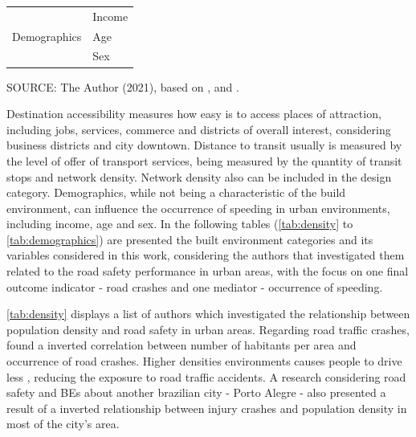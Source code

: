 \begin{table}[!hbtp]
\begin{tabular}{ll}
                                                    \hline
        \multirow{3}{*}{Demographics}              & Income                                   \\
                                                   & Age                                      \\
                                                   & Sex                                      \\ \hline
        \end{tabular}
    \label{tab:6d}
    \par \vspace{2mm} \footnotesize \raggedright
    SOURCE: The Author (2021), based on \textcite{Ewing2009}, \textcite{Ewing2010} and \textcite{Obelheiro2020}.
\end{table}

Destination accessibility measures how easy is to access places of attraction, including jobs, services, commerce and districts of overall interest, considering business districts and city downtown. Distance to transit usually is measured by the level of offer of transport services, being measured by the quantity of transit stops and network density. Network density also can be included in the design category. Demographics, while not being a characteristic of the build environment, can influence the occurrence of speeding in urban environments, including income, age and sex. In the following tables (\autoref{tab:density} to \autoref{tab:demographics}) are presented the built environment categories and its variables considered in this work, considering the authors that investigated them related to the road safety performance in urban areas, with the focus on one final outcome indicator - road crashes and one mediator - occurrence of speeding.



\autoref{tab:density} displays a list of authors which investigated the relationship between population density and road safety in urban areas. Regarding road traffic crashes, \textcite{Dumbaugh2009, Obelheiro2020} found a inverted correlation between number of habitants per area and occurrence of road crashes. Higher densities environments causes people to drive less \cite{Dumbaugh2009}, reducing the exposure to road traffic accidents. A research considering road safety and BEs about another brazilian city - Porto Alegre - also presented a result of a inverted relationship between injury crashes and population density in most of the city's area.

